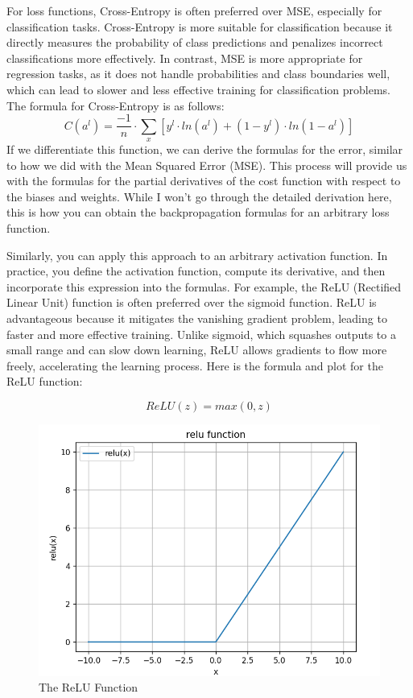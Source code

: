 \documentclass[../main]{subfiles}
\begin{document}
For loss functions, Cross-Entropy is often preferred over MSE, especially for classification tasks. Cross-Entropy is more suitable for classification because it directly measures the probability of class predictions and penalizes incorrect classifications more effectively. In contrast, MSE is more appropriate for regression tasks, as it does not handle probabilities and class boundaries well, which can lead to slower and less effective training for classification problems. The formula for Cross-Entropy is as follows:
\begin{equation*}
    C(a^l) = \frac{-1}{n} \cdot \sum_x [y^l\cdot ln(a^l)+(1-y^l)\cdot ln(1-a^l)]
\end{equation*}
If we differentiate this function, we can derive the formulas for the error, similar to how we did with the Mean Squared Error (MSE). This process will provide us with the formulas for the partial derivatives of the cost function with respect to the biases and weights. While I won’t go through the detailed derivation here, this is how you can obtain the backpropagation formulas for an arbitrary loss function.

Similarly, you can apply this approach to an arbitrary activation function. In practice, you define the activation function, compute its derivative, and then incorporate this expression into the formulas. For example, the ReLU (Rectified Linear Unit) function is often preferred over the sigmoid function. ReLU is advantageous because it mitigates the vanishing gradient problem, leading to faster and more effective training. Unlike sigmoid, which squashes outputs to a small range and can slow down learning, ReLU allows gradients to flow more freely, accelerating the learning process. Here is the formula and plot for the ReLU function:

\begin{equation*}
    ReLU(z) = max(0, z)
\end{equation*}

\begin{figure}[H]
  \centering
  \includegraphics[width = 0.8 \textwidth]{./figures/relu}
  \caption{The ReLU Function}
  \label{fig:red}
\end{figure}
\end{document}
